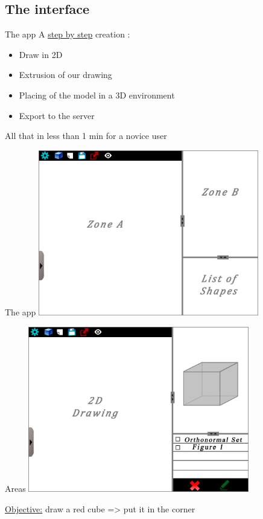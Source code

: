\documentclass[a4paper,10pt]{beamer}
\begin{document}
		\subsection{The interface}
		
		
			\begin{frame}{The app}
				A \underline{step by step} creation :
				\begin{itemize}
					\item Draw in 2D
					\item Extrusion of our drawing
					\item Placing of the model in a 3D environment
					\item Export to the server
				\end{itemize}
				All that in less than 1 min for a novice user
			\end{frame}
		
		
			\begin{frame}{The app}
				\includegraphics[height=205pt]{maquette/maquette_1.png}
			\end{frame}
			
			\begin{frame}{Areas}
				\includegraphics[height=205pt]{maquette/maquette_2.png}
				
				\pause
				
				\underline{Objective:} draw a red cube => put it in the corner
			\end{frame}
			
\end{document}
